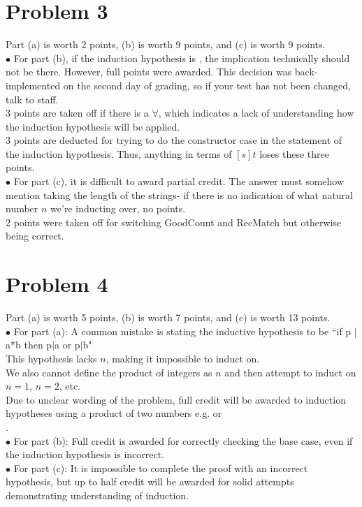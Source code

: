 \documentclass{article}
\begin{document}
\section*{Problem 3}
Part (a) is worth 2 points, (b) is worth 9 points, and (c) is worth 9 points. 
\\ $\bullet$ For part (b), if the induction hypothesis is , the implication technically should not be there. However, full points were awarded. This decision was back-implemented on the second day of grading, so if your test has not been changed, talk to staff. 
\\3 points are taken off if there is a $\forall$, which indicates a lack of understanding how the induction hypothesis will be applied. 
\\3 points are deducted for trying to do the constructor case in the statement of the induction hypothesis. Thus, anything in terms of $[s] t$ loses these three points. 
\\ $\bullet$ For part (c), it is difficult to award partial credit. The answer must somehow mention taking the length of the strings- if there is no indication of what natural number $n$ we're inducting over, no points.
\\2 points were taken off for switching GoodCount and RecMatch but otherwise being correct.


\section*{Problem 4}
Part (a) is worth 5 points, (b) is worth 7 points, and (c) is worth 13 points. 
\\ $\bullet $ For part (a): A common mistake is stating the inductive hypothesis to be ``if p $\vert$ a*b then p$\vert$a or p$\vert$b"
\\ This hypothesis lacks $n$, making it impossible to induct on. 
\\We also cannot define the product of integers as $n$ and then attempt to induct on $n=1$, $n=2$, etc.
\\Due to unclear wording of the problem, full credit will be awarded to induction hypotheses using a product of two numbers e.g.   or \\ . 
\\ $\bullet$ For part (b): Full credit is awarded for correctly checking the base case, even if the induction hypothesis is incorrect.
\\ $\bullet$ For part (c): It is impossible to complete the proof with an incorrect hypothesis, but up to half credit will be awarded for solid attempts demonstrating understanding of induction.
\end{document}
